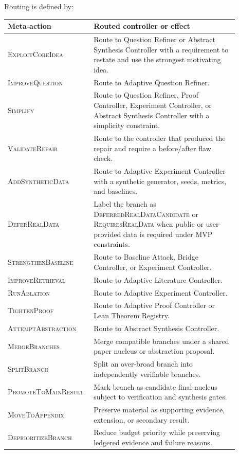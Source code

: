 \documentclass[11pt]{article}
\begin{document}
Routing is defined by:
\begin{center}
\begin{tabular}{p{0.29\linewidth} p{0.60\linewidth}}
\toprule
Meta-action & Routed controller or effect \\
\midrule
\textsc{ExploitCoreIdea} & Route to Question Refiner or Abstract Synthesis Controller with a requirement to restate and use the strongest motivating idea. \\
\textsc{ImproveQuestion} & Route to Adaptive Question Refiner. \\
\textsc{Simplify} & Route to Question Refiner, Proof Controller, Experiment Controller, or Abstract Synthesis Controller with a simplicity constraint. \\
\textsc{ValidateRepair} & Route to the controller that produced the repair and require a before/after flaw check. \\
\textsc{AddSyntheticData} & Route to Adaptive Experiment Controller with a synthetic generator, seeds, metrics, and baselines. \\
\textsc{DeferRealData} & Label the branch as \textsc{DeferredRealDataCandidate} or \textsc{RequiresRealData} when public or user-provided data is required under MVP constraints. \\
\textsc{StrengthenBaseline} & Route to Baseline Attack, Bridge Controller, or Experiment Controller. \\
\textsc{ImproveRetrieval} & Route to Adaptive Literature Controller. \\
\textsc{RunAblation} & Route to Adaptive Experiment Controller. \\
\textsc{TightenProof} & Route to Adaptive Proof Controller or Lean Theorem Registry. \\
\textsc{AttemptAbstraction} & Route to Abstract Synthesis Controller. \\
\textsc{MergeBranches} & Merge compatible branches under a shared paper nucleus or abstraction proposal. \\
\textsc{SplitBranch} & Split an over-broad branch into independently verifiable branches. \\
\textsc{PromoteToMainResult} & Mark branch as candidate final nucleus subject to verification and synthesis gates. \\
\textsc{MoveToAppendix} & Preserve material as supporting evidence, extension, or secondary result. \\
\textsc{DeprioritizeBranch} & Reduce budget priority while preserving ledgered evidence and failure reasons. \\

\end{tabular}
\end{center}
\end{document}
